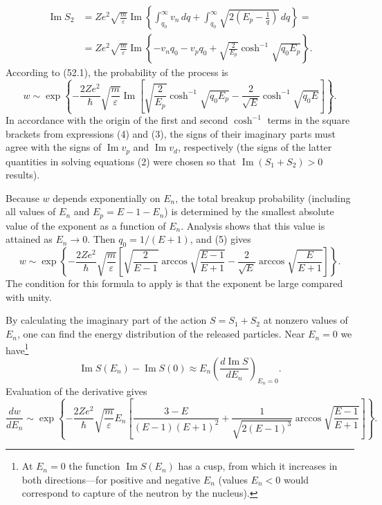 \begin{equation}
 \begin{aligned}
 \operatorname{Im}S_2
 &=Ze^2\sqrt{\frac m\varepsilon}\operatorname{Im}
 \left\{\int_{q_0}^\infty v_n\,dq+
 \int_{q_0}^\infty\sqrt{2\left(E_p-\frac1q\right)}\,dq\right\}={}\\
 &=Ze^2\sqrt{\frac m\varepsilon}\operatorname{Im}
 \left\{-v_nq_0-v_pq_0+\sqrt{\frac2{E_p}}
 \cosh^{-1}\sqrt{q_0E_p}\right\}.
 \end{aligned}
 \tag{4}
\end{equation}
According to (52.1), the probability of the process is
\begin{equation}
 w\sim\exp\left\{-\frac{2Ze^2}\hbar\sqrt{\frac m\varepsilon}
 \operatorname{Im}\left[
 \sqrt{\frac2{E_p}}\cosh^{-1}\sqrt{q_0E_p}
 -\frac2{\sqrt E}\cosh^{-1}\sqrt{q_0E}\right]\right\}.
 \tag{5}
\end{equation}
In accordance with the origin of the first and second $\cosh^{-1}$
terms in the square brackets from expressions (4) and (3), the signs of their
imaginary parts must agree with the signs of $\operatorname{Im}v_p$ and
$\operatorname{Im}v_d$, respectively (the signs of the latter quantities in
solving equations (2) were chosen so that
$\operatorname{Im}(S_1+S_2)>0$ results).

Because $w$ depends exponentially on $E_n$, the total breakup probability
(including all values of $E_n$ and $E_p=E-1-E_n$) is determined by the
smallest absolute value of the exponent as a function of $E_n$. Analysis shows
that this value is attained as $E_n\to0$. Then $q_0=1/(E+1)$, and (5) gives
\[
 w\sim\exp\left\{-\frac{2Ze^2}\hbar\sqrt{\frac m\varepsilon}
 \left[\sqrt{\frac2{E-1}}\arccos\sqrt{\frac{E-1}{E+1}}
 -\frac2{\sqrt E}\arccos\sqrt{\frac E{E+1}}\right]\right\}.
\]
The condition for this formula to apply is that the exponent be large compared
with unity.

By calculating the imaginary part of the action $S=S_1+S_2$ at nonzero values
of $E_n$, one can find the energy distribution of the released particles. Near
$E_n=0$ we have\footnote{At $E_n=0$ the function
$\operatorname{Im}S(E_n)$ has a cusp, from which it increases in both
directions---for positive and negative $E_n$ (values $E_n<0$ would correspond
to capture of the neutron by the nucleus).}
\[
 \operatorname{Im}S(E_n)-\operatorname{Im}S(0)\approx
 E_n\left(\frac{d\operatorname{Im}S}{dE_n}\right)_{E_n=0}.
\]
Evaluation of the derivative gives
\[
 \frac{dw}{dE_n}\sim\exp\left\{-\frac{2Ze^2}\hbar
 \sqrt{\frac m\varepsilon}E_n\left[
 \frac{3-E}{(E-1)(E+1)^2}+
 \frac1{\sqrt{2(E-1)^3}}\arccos\sqrt{\frac{E-1}{E+1}}
 \right]\right\}.
\]

